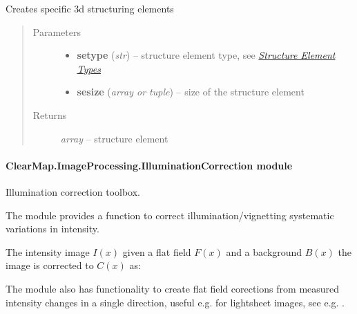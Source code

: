 \documentclass[letterpaper,10pt,english]{sphinxmanual}
\begin{document}

\begin{fulllineitems}
\label{api/ClearMap.ImageProcessing.Filter:ClearMap.ImageProcessing.Filter.StructureElement.structureElement3D}
Creates specific 3d structuring elements
\begin{quote}\begin{description}
\item[{Parameters}] \leavevmode\begin{itemize}
\item {} 
\textbf{setype} (\emph{str}) --
structure element type, see {\hyperref[api/ClearMap.ImageProcessing.Filter:structureelementtypes]{\emph{Structure Element Types}}}

\item {} 
\textbf{sesize} (\emph{array or tuple}) --
size of the structure element

\end{itemize}

\item[{Returns}] \leavevmode
\emph{array} --
structure element

\end{description}\end{quote}

\end{fulllineitems}



\paragraph{ClearMap.ImageProcessing.IlluminationCorrection module}
\label{api/ClearMap.ImageProcessing:clearmap-imageprocessing-illuminationcorrection-module}\label{api/ClearMap.ImageProcessing:module-ClearMap.ImageProcessing.IlluminationCorrection}
Illumination correction toolbox.

The module provides a function to correct illumination/vignetting systematic
variations in intensity.

The intensity image \(I(x)\) given a flat field \(F(x)\) and
a background \(B(x)\) the image is corrected to \(C(x)\) as:

The module also has functionality to create flat field corections from measured
intensity changes in a single direction, useful e.g. for lightsheet images,
see e.g. {\hyperref[api/ClearMap.ImageProcessing:ClearMap.ImageProcessing.IlluminationCorrection.flatfieldLineFromRegression]{\emph{}}}.
\end{document}
